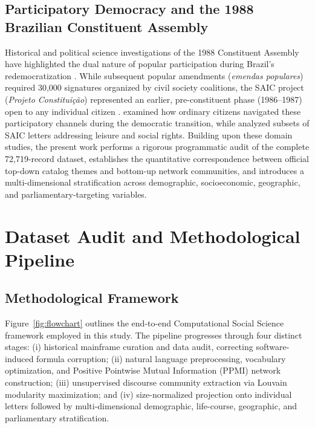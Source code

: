 \documentclass[pdflatex,sn-basic]{sn-jnl}
\begin{document}
\subsection{Participatory Democracy and the 1988 Brazilian Constituent Assembly}
Historical and political science investigations of the 1988 Constituent Assembly have highlighted the dual nature of popular participation during Brazil's redemocratization \citep{souza2008regras,pogrebinschi2014impact,montambeault2018constituicao,mcdonald2022making}. While subsequent popular amendments (\textit{emendas populares}) required 30,000 signatures organized by civil society coalitions, the SAIC project (\textit{Projeto Constitui\c{c}\~{a}o}) represented an earlier, pre-constituent phase (1986--1987) open to any individual citizen \citep{mcdonald2022making,santos2024lazer}. \citet{mcdonald2022making} examined how ordinary citizens navigated these participatory channels during the democratic transition, while \citet{santos2024lazer} analyzed subsets of SAIC letters addressing leisure and social rights. Building upon these domain studies, the present work performs a rigorous programmatic audit of the complete 72,719-record dataset, establishes the quantitative correspondence between official top-down catalog themes and bottom-up network communities, and introduces a multi-dimensional stratification across demographic, socioeconomic, geographic, and parliamentary-targeting variables.

\section{Dataset Audit and Methodological Pipeline}\label{sec3}
\subsection{Methodological Framework}
Figure~\ref{fig:flowchart} outlines the end-to-end Computational Social Science framework employed in this study. The pipeline progresses through four distinct stages: (i) historical mainframe curation and data audit, correcting software-induced formula corruption; (ii) natural language preprocessing, vocabulary optimization, and Positive Pointwise Mutual Information (PPMI) network construction; (iii) unsupervised discourse community extraction via Louvain modularity maximization; and (iv) size-normalized projection onto individual letters followed by multi-dimensional demographic, life-course, geographic, and parliamentary stratification.
\end{document}

